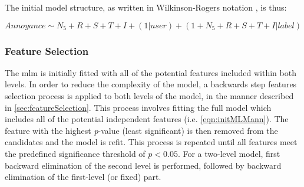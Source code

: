 The initial model structure, as written in Wilkinson-Rogers notation \citep{Wilkinson1973Symbolic}, is thus:


\begin{equation}
  \label{eqn:initMLMann}
      Annoyance \sim N_5 + R + S + T + I + (1 | user) + (1 + N_5 + R + S + T + I | label)
  \end{equation}

\subsubsection{Feature Selection}

The \gls{mlm} is initially fitted with all of the potential features included within both levels. In order to reduce the complexity of the model, a backwards step features selection process is applied to both levels of the model, in the manner described in \cref{sec:featureSelection}. This process involves fitting the full model which includes all of the potential independent features (i.e. \cref{eqn:initMLMann}). The feature with the highest \emph{p}-value (least significant)\footnotemark{} is then removed from the candidates and the model is refit. This process is repeated until all features meet the predefined significance threshold of $p < 0.05 $. For a two-level model, first backward elimination of the second level is performed, followed by backward elimination of the first-level (or fixed) part. 



